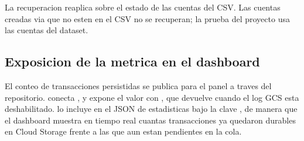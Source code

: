 \begin{advertencia}
La recuperacion reaplica sobre el estado de las cuentas del CSV. Las cuentas
creadas via  que no esten en el CSV no se recuperan; la
prueba del proyecto usa las cuentas del dataset.
\end{advertencia}

\subsection{Exposicion de la metrica en el dashboard}

El conteo de transacciones persistidas se publica para el panel a traves del
repositorio.  conecta ,
y  expone el valor con
, que devuelve  cuando el log GCS esta
deshabilitado.  lo incluye en el JSON de
estadisticas bajo la clave , de manera que el dashboard
muestra en tiempo real cuantas transacciones ya quedaron durables en Cloud
Storage frente a las que aun estan pendientes en la cola.
